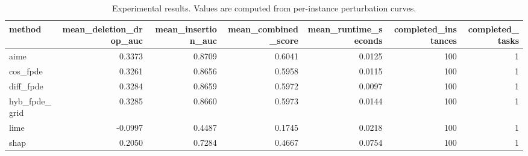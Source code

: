 \begin{table}[t]
\caption{Experimental results. Values are computed from per-instance perturbation curves.}
\label{tab:main_results_computed}
\centering
\begin{tabular}{lrrrrrr}
\toprule
method & mean\_deletion\_drop\_auc & mean\_insertion\_auc & mean\_combined\_score & mean\_runtime\_seconds & completed\_instances & completed\_tasks \\
\midrule
aime & 0.3373 & 0.8709 & 0.6041 & 0.0125 & 100 & 1 \\
cos\_fpde & 0.3261 & 0.8656 & 0.5958 & 0.0115 & 100 & 1 \\
diff\_fpde & 0.3284 & 0.8659 & 0.5972 & 0.0097 & 100 & 1 \\
hyb\_fpde\_grid & 0.3285 & 0.8660 & 0.5973 & 0.0144 & 100 & 1 \\
lime & -0.0997 & 0.4487 & 0.1745 & 0.0218 & 100 & 1 \\
shap & 0.2050 & 0.7284 & 0.4667 & 0.0754 & 100 & 1 \\
\bottomrule
\end{tabular}

\end{table}
